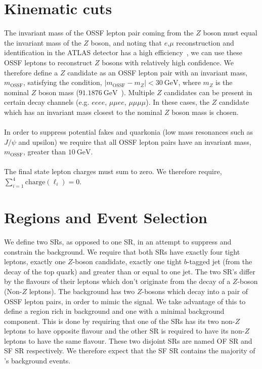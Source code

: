 \section{Kinematic cuts}
The invariant mass of the OSSF lepton pair coming from the $Z$ boson must equal the invariant mass of the $Z$ boson, and noting that $e$,$\mu$ reconstruction and identification in the ATLAS detector has a high efficiency~\cite{}, we can use these OSSF leptons to reconstruct $Z$ bosons with relatively high confidence. We therefore define a $Z$ candidate as an OSSF lepton pair with an invariant mass, $m_{\text{OSSF}}$, satisfying the condition, $|m_{\text{OSSF}} - m_Z| <  \SI{30}{\GeV}$, where $m_Z$ is the nominal $Z$ boson mass ($\SI{91.1876}{\GeV}$~\cite{pdg}). Multiple $Z$ candidates can be present in certain decay channels (e.g. $eeee$, $\mu\mu ee$, $\mu \mu \mu \mu$). In these cases, the $Z$ candidate which has an invariant mass closest to the nominal $Z$ boson mass is chosen.\\\\
In order to suppress potential fakes and quarkonia (low mass resonances such as $J/\psi$ and upsilon) we require that all OSSF lepton pairs have an invariant mass, $m_{\text{OSSF}}$, greater than $\SI{10}{\GeV}$.\\\\
The final state lepton charges must sum to zero. We therefore require, $\displaystyle\sum_{i=1}^{4} \text{charge}(\ell_i) = 0$.



\section{Regions and Event Selection}
\label{sec:regionsAndEventSelection}

We define two \tWZ SRs, as opposed to one \tWZ SR, in an attempt to suppress and constrain the \ZZ background. We require that both \tWZ SRs have exactly four tight leptons, exactly one $Z$-boson candidate, exactly one tight $b$-tagged jet (from the decay of the top quark) and greater than or equal to one jet. The two \tWZ SR's differ by the flavours of their leptons which don't originate from the decay of a $Z$-boson (Non-$Z$ leptons). The \ZZ background has two $Z$-bosons which decay into a pair of OSSF lepton pairs, in order to mimic the \tWZ signal. We take advantage of this to define a \tWZ region rich in \ZZ background and one with a minimal \ZZ background component. This is done by requiring that one of the \tWZ SRs has its two non-$Z$ leptons to have opposite flavour and the other \tWZ SR is required to have its non-$Z$ leptons to have the same flavour. These two disjoint \tWZ SRs are named \tWZ OF SR and \tWZ SF SR respectively. We therefore expect that the \tWZ SF SR contains the majority of \tWZ's \ZZ background events. \\\\


